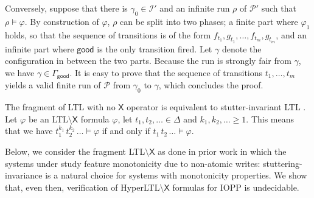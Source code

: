 \documentclass[10pt,a4paper]{article}
\renewcommand{\geq}{\geqslant}
\newcommand{\concat}{\,}
\newcommand{\config}{\gamma}
\newcommand{\configs}{\Gamma}
\newcommand{\initialconfigs}{\mathcal{I}}
\newcommand{\run}{\rho}
\newcommand{\transitions}{\Delta}
\newcommand*{\atrans}{t}
\newcommand{\PP}{\mathcal{P}}                  %
\newcommand{\ltlnext}{\mathsf{X}}
\newcommand{\tgood}{\mathsf{good}}
\newcommand{\goodconfigs}{\configs_{\mathsf{good}}}
\begin{document}
\begin{appendixproof}
	Conversely, suppose that there is \(\config_0 \in \initialconfigs'\) and an infinite run \(\run\) of \(\PP'\) such that \(\run \models \varphi\).
	By construction of \(\varphi\), \(\run\) can be split into two phases; a finite part where \(\varphi_1\) holds, so that the sequence of transitions is of the form \(f_{\atrans_1}, g_{\atrans_1},\dots,f_{\atrans_m}, g_{\atrans_m}\), and an infinite part where \(\tgood\) is the only transition fired.
	Let \(\config\) denote the configuration in between the two parts.
	Because the run is strongly fair from \(\config\), we have \(\config \in \goodconfigs\).
	It is easy to prove that the sequence of transitions \(\atrans_1, \dots, \atrans_m\) yields a valid finite run of \(\PP\) from \(\config_0\) to \(\config\), which concludes the proof.
\end{appendixproof}

\begin{remark}
	\label{rmk:stutter-inv}
	The fragment of LTL with no \(\ltlnext\) operator is equivalent to stutter-invariant LTL \cite{PeledW97,Etessami00}.
	Let \(\varphi\) be an LTL\(\setminus \ltlnext\) formula \(\varphi\), let \(t_1,t_2,\ldots \in \transitions\) and \(k_1, k_2, \ldots \geq 1\).
	This means that we have \(t_1^{k_1} \concat t_2^{k_2} \concat \ldots \models \varphi\) if and only if \(t_1 \concat t_2 \concat \ldots \models \varphi\).
\end{remark}

Below, we consider the fragment LTL\(\setminus \ltlnext\) as done in prior work \cite{FortinMW17} in which the systems under study feature monotonicity due to non-atomic writes: stuttering-invariance is a natural choice for systems with monotonicity properties.
We show that, even then, verification of HyperLTL\(\setminus \ltlnext\) formulas for IOPP is undecidable.
\end{document}
